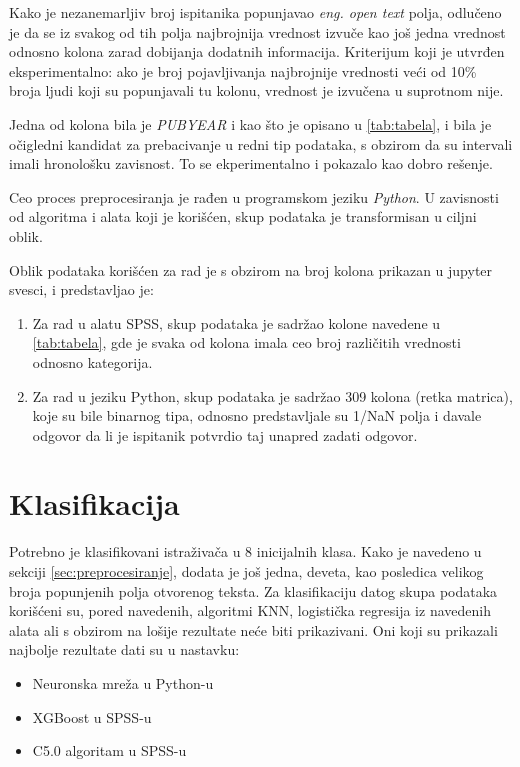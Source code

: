 \documentclass[12pt]{article}
\begin{document}
Kako je nezanemarljiv broj ispitanika popunjavao \textit{eng. open text} polja, odlučeno je da se iz svakog od tih polja najbrojnija vrednost izvuče kao još jedna vrednost odnosno kolona zarad dobijanja dodatnih informacija. Kriterijum koji je utvrđen eksperimentalno: ako je broj pojavljivanja najbrojnije vrednosti veći od 10\% broja ljudi koji su popunjavali tu kolonu, vrednost je izvučena u suprotnom nije.

Jedna od kolona bila je \textit{PUBYEAR} i kao što je opisano u \ref{tab:tabela}, i bila je očigledni kandidat za prebacivanje u redni tip podataka, s obzirom da su intervali imali hronološku zavisnost. To se ekperimentalno i pokazalo kao dobro rešenje.

Ceo proces preprocesiranja je rađen u programskom jeziku \textit{Python}. U zavisnosti od algoritma i alata koji je korišćen, skup podataka je transformisan u ciljni oblik. 

Oblik podataka korišćen za rad je s obzirom na broj kolona prikazan u jupyter svesci, i predstavljao je:
\begin{enumerate}
    \item Za rad u alatu SPSS, skup podataka je sadržao kolone navedene u \ref{tab:tabela}, gde je svaka od kolona imala ceo broj različitih vrednosti odnosno kategorija.
    \item Za rad u jeziku Python, skup podataka je sadržao 309 kolona (retka matrica), koje su bile binarnog tipa, odnosno predstavljale su 1/NaN polja i davale odgovor da li je ispitanik potvrdio taj unapred zadati odgovor.
\end{enumerate}

\newpage
\section{Klasifikacija}
\label{klasifikacija}
Potrebno je klasifikovani istraživača u 8 inicijalnih klasa. Kako je navedeno u sekciji \ref{sec:preprocesiranje}, dodata je još jedna, deveta, kao posledica velikog broja popunjenih polja otvorenog teksta.
Za klasifikaciju datog skupa podataka korišćeni su, pored navedenih, algoritmi KNN, logistička regresija iz navedenih alata ali s obzirom na lošije rezultate neće biti prikazivani. Oni koji su prikazali najbolje rezultate dati su u nastavku:
\begin{itemize}
  \item Neuronska mreža u Python-u
  \item XGBoost u SPSS-u 
  \item C5.0 algoritam u SPSS-u
\end{itemize}
\end{document}
